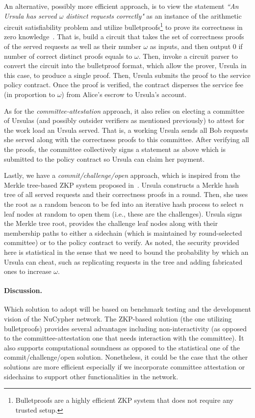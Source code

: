 \documentclass{llncs}
\begin{document}
An alternative, possibly more efficient approach, is to view the statement \emph{``An Ursula has served $\omega$ distinct requests correctly"} as an instance of the arithmetic circuit satisfiability problem and utilize bulletproofs\footnote{Bulletproofs are a highly efficient ZKP system that does not require any trusted setup.} to prove its correctness in zero knowledge~\cite{bunz18}. That is, build a circuit that takes the set of correctness proofs of the served requests as well as their number $\omega$ as inputs, and then output 0 if number of correct distinct proofs equals to $\omega$. Then, invoke a circuit parser to convert the circuit into the bulletproof format, which allow the prover, Ursula in this case, to produce a single proof. Then, Ursula submits the proof to the service policy contract. Once the proof is verified, the contract disperses the service fee (in proportion to $\omega$) from Alice's escrow to Ursula's account.


As for the \emph{committee-attestation} approach, it also relies on electing a committee of Ursulas (and possibly outsider verifiers as mentioned previously) to attest for the work load an Ursula served. That is, a working Ursula sends all Bob requests she served along with the correctness proofs to this committee. After verifying all the proofs, the committee collectively signs a statement as above which is submitted to the policy contract so Ursula can claim her payment.


Lastly, we have a \emph{commit/challenge/open} approach, which is inspired from the Merkle tree-based ZKP system proposed in~\cite{dottling19}. Ursula constructs a Merkle hash tree of all served requests and their correctness proofs in a round. Then, she uses the root as a random beacon to be fed into an iterative hash process to select $n$ leaf nodes at random to open them (i.e., these are the challenges). Ursula signs the Merkle tree root, provides the challenge leaf nodes along with their membership paths to either a sidechain (which is maintained by round-selected committee) or to the policy contract to verify. As noted, the security provided here is statistical in the sense that we need to bound the probability by which an Ursula can cheat, such as replicating requests in the tree and adding fabricated ones to increase $\omega$. 


\paragraph{Discussion.} Which solution to adopt will be based on benchmark testing and the development vision of the NuCypher network. The ZKP-based solution (the one utilizing bulletproofs) provides several advantages including non-interactivity (as opposed to the committee-attestation one that needs interaction with the committee). It also supports computational soundness as opposed to the statistical one of the commit/challenge/open solution. Nonetheless, it could be the case that the other solutions are more efficient especially if we incorporate committee attestation or sidechains to support other functionalities in the network. 
\end{document}
